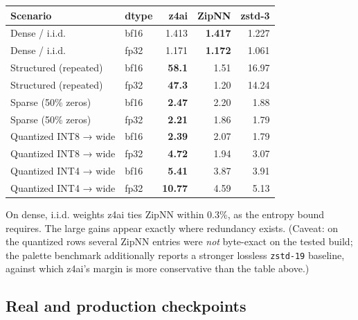 \documentclass[
]{article}
\begin{document}
\begin{longtable}[]{@{}llrrr@{}}
\toprule\noalign{}
Scenario & dtype & z4ai & ZipNN & zstd-3 \\
\midrule\noalign{}
\endhead
\bottomrule\noalign{}
\endlastfoot
Dense / i.i.d. & bf16 & 1.413 & \textbf{1.417} & 1.227 \\
Dense / i.i.d. & fp32 & 1.171 & \textbf{1.172} & 1.061 \\
Structured (repeated) & bf16 & \textbf{58.1} & 1.51 & 16.97 \\
Structured (repeated) & fp32 & \textbf{47.3} & 1.20 & 14.24 \\
Sparse (50\% zeros) & bf16 & \textbf{2.47} & 2.20 & 1.88 \\
Sparse (50\% zeros) & fp32 & \textbf{2.21} & 1.86 & 1.79 \\
Quantized INT8 → wide & bf16 & \textbf{2.39} & 2.07 & 1.79 \\
Quantized INT8 → wide & fp32 & \textbf{4.72} & 1.94 & 3.07 \\
Quantized INT4 → wide & bf16 & \textbf{5.41} & 3.87 & 3.91 \\
Quantized INT4 → wide & fp32 & \textbf{10.77} & 4.59 & 5.13 \\
\end{longtable}

On dense, i.i.d. weights z4ai ties ZipNN within 0.3\%, as the entropy
bound requires. The large gains appear exactly where redundancy exists.
(Caveat: on the quantized rows several ZipNN entries were \emph{not}
byte-exact on the tested build; the palette benchmark additionally
reports a stronger lossless \texttt{zstd-19} baseline, against which
z4ai's margin is more conservative than the table above.)

\subsection{Real and production
checkpoints}\label{real-and-production-checkpoints}
\end{document}
